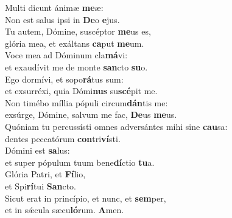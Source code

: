 \evenverse Multi dicunt ánimæ \textbf{me}æ:~\*\\
\evenverse Non est salus ipsi in \textbf{De}o \textbf{e}jus.\\
\oddverse Tu autem, Dómine, suscéptor \textbf{me}us es,~\*\\
\oddverse glória mea, et exáltans \textbf{ca}put \textbf{me}um.\\
\evenverse Voce mea ad Dóminum cla\textbf{má}vi:~\*\\
\evenverse et exaudívit me de monte \textbf{san}cto \textbf{su}o.\\
\oddverse Ego dormívi, et sopo\textbf{rá}tus sum:~\*\\
\oddverse et exsurréxi, quia Dómi\textbf{nus} su\textbf{scé}pit me.\\
\evenverse Non timébo míllia pópuli circum\textbf{dán}tis me:~\*\\
\evenverse exsúrge, Dómine, salvum me fac, \textbf{De}us \textbf{me}us.\\
\oddverse Quóniam tu percussísti omnes adversántes mihi sine \textbf{cau}sa:~\*\\
\oddverse dentes peccatórum \textbf{con}tri\textbf{ví}sti.\\
\evenverse Dómini est \textbf{sa}lus:~\*\\
\evenverse et super pópulum tuum bene\textbf{dí}ctio \textbf{tu}a.\\
\oddverse Glória Patri, et \textbf{Fí}lio,~\*\\
\oddverse et Spi\textbf{rí}tui \textbf{San}cto.\\
\evenverse Sicut erat in princípio, et nunc, et \textbf{sem}per,~\*\\
\evenverse et in sǽcula sæcu\textbf{ló}rum. \textbf{A}men.\\
